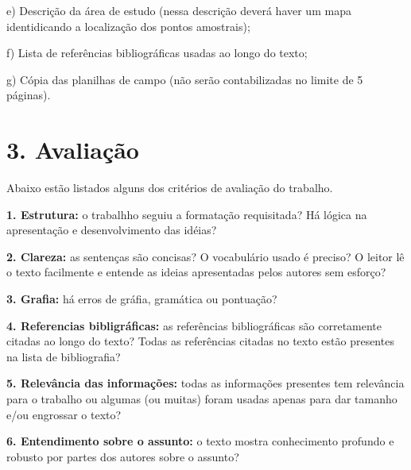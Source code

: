 \documentclass[a4paper,10pt]{article}
\begin{document}
    e) Descrição da área de estudo (nessa descrição deverá haver um mapa identidicando a localização dos pontos amostrais);
  
    f) Lista de referências bibliográficas usadas ao longo do texto; 
    
    g) Cópia das planilhas de campo (não serão contabilizadas no limite de 5 páginas).
  
  \section* {3. Avaliação}
  
    Abaixo estão listados alguns dos critérios de avaliação do trabalho.
    
    \textbf{1. Estrutura:} o trabalhho seguiu a formatação requisitada? Há lógica na apresentação e desenvolvimento das idéias? 
    
    \textbf{2. Clareza:} as sentenças são concisas? O vocabulário usado é preciso? O leitor lê o texto facilmente e entende as ideias apresentadas pelos autores sem esforço?
    
    \textbf{3. Grafia:} há erros de gráfia, gramática ou pontuação? 
    
    \textbf{4. Referencias bibligráficas:} as referências bibliográficas são corretamente citadas ao longo do texto? Todas as referências citadas no texto estão presentes na lista de bibliografia? 
    
    \textbf{5. Relevância das informações:} todas as informações presentes tem relevância para o trabalho ou algumas (ou muitas) foram usadas apenas para dar tamanho e/ou engrossar o texto? 
    
    \textbf{6. Entendimento sobre o assunto:} o texto mostra conhecimento profundo e robusto por partes dos autores sobre o assunto? 
  
  \clearpage %
\end{document}
